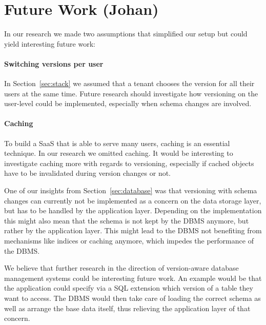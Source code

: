 \section{Future Work (Johan)}
\label{sec:futurework}

In our research we made two assumptions that simplified our setup but could yield interesting future work:

\paragraph{Switching versions per user} In Section~\ref{sec:stack} we assumed that a tenant chooses the version for all their users at the same time. Future research should investigate how versioning on the user-level could be implemented, especially when schema changes are involved.

\paragraph{Caching} To build a SaaS that is able to serve many users, caching is an essential technique. In our research we omitted caching. It would be interesting to investigate caching more with regards to versioning, especially if cached objects have to be invalidated during version changes or not.

\vspace{4 mm}

One of our insights from Section~\ref{sec:database} was that versioning with schema changes can currently not be implemented as a concern on the data storage layer, but has to be handled by the application layer. Depending on the implementation this might also mean that the schema is not kept by the DBMS anymore, but rather by the application layer. This might lead to the DBMS not benefiting from mechanisms like indices or caching anymore, which impedes the performance of the DBMS.

We believe that further research in the direction of version-aware database management systems could be interesting future work. An example would be that the application could specify via a SQL extension which version of a table they want to access. The DBMS would then take care of loading the correct schema as well as arrange the base data itself, thus relieving the application layer of that concern.
